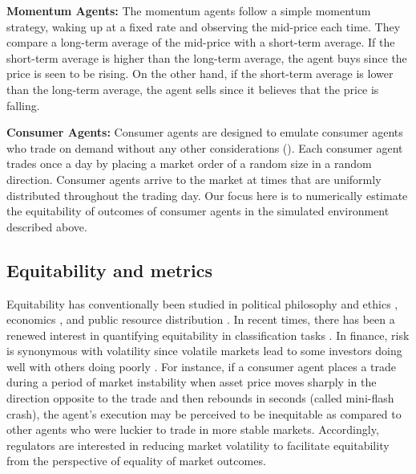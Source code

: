\documentclass[sigconf]{acmart}
\begin{document}
{\bf Momentum Agents:} The momentum agents follow a simple momentum strategy, waking up at a fixed rate and observing the mid-price each time. They compare a long-term average of the mid-price with a short-term average. If the short-term average is higher than the long-term average, the agent buys since the price is seen to be rising. On the other hand, if the short-term average is lower than the long-term average, the agent sells since it believes that the price is falling.

{\bf Consumer Agents:} Consumer agents are designed to emulate consumer agents who trade on demand without any other considerations (\cite{kyle1985continuous}). Each consumer agent trades once a day by placing a market order of a random size in a random direction. Consumer agents arrive to the market at times that are uniformly distributed throughout the trading day. Our focus here is to numerically estimate the equitability of outcomes of consumer agents in the simulated environment described above.


\subsection{Equitability and metrics\label{subsec:metrics}}

Equitability has conventionally been studied in political philosophy and ethics \cite{johnrawls}, economics \cite{hmoulin}, and public resource distribution \cite{peytonyoung}. In recent times, there has been a renewed interest in quantifying equitability in classification tasks \cite{dwork2012fairness}. In finance, risk is synonymous with volatility since volatile markets lead to some investors doing well with others doing poorly \cite{oregonlaw}. For instance, if a consumer agent places a trade during a period of market instability when asset price moves sharply in the direction opposite to the trade and then rebounds in seconds (called mini-flash crash), the agent's execution may be perceived to be inequitable as compared to other agents who were luckier to trade in more stable markets. Accordingly, regulators are interested in reducing market volatility to facilitate equitability from the perspective of equality of market outcomes.
\end{document}

